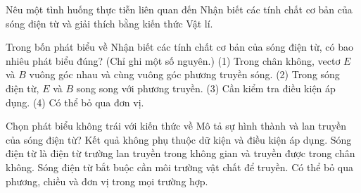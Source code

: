 \begin{bt}
Nêu một tình huống thực tiễn liên quan đến Nhận biết các tính chất cơ bản của sóng điện từ và giải thích bằng kiến thức Vật lí.
\end{bt}

\begin{ex}
Trong bốn phát biểu về Nhận biết các tính chất cơ bản của sóng điện từ, có bao nhiêu phát biểu đúng? (Chỉ ghi một số nguyên.) (1) Trong chân không, vectơ $E$ và $B$ vuông góc nhau và cùng vuông góc phương truyền sóng. (2) Trong sóng điện từ, $E$ và $B$ song song với phương truyền. (3) Cần kiểm tra điều kiện áp dụng. (4) Có thể bỏ qua đơn vị.
\end{ex}

\begin{ex}
Chọn phát biểu không trái với kiến thức về Mô tả sự hình thành và lan truyền của sóng điện từ?
\choice
{Kết quả không phụ thuộc dữ kiện và điều kiện áp dụng.}
{\True Sóng điện từ là điện từ trường lan truyền trong không gian và truyền được trong chân không.}
{Sóng điện từ bắt buộc cần môi trường vật chất để truyền.}
{Có thể bỏ qua phương, chiều và đơn vị trong mọi trường hợp.}
\end{ex}


